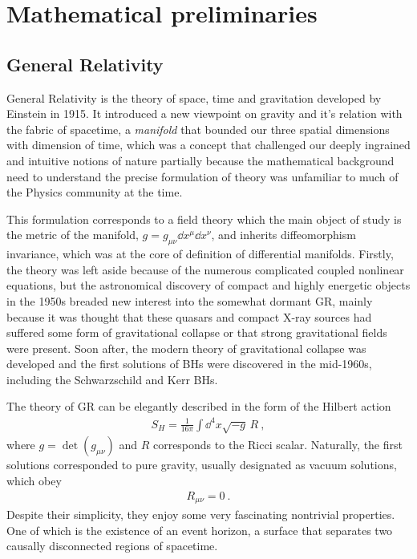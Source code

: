 
\chapter{Mathematical preliminaries} %
\label{Chapter2}


\section{General Relativity}

General Relativity is the theory of space, time and gravitation developed by Einstein in 1915. 
It introduced a new viewpoint on gravity and it's relation with the fabric of spacetime, a \emph{manifold} that bounded our three spatial dimensions with dimension of time, which was a concept that challenged our deeply ingrained and intuitive notions of nature partially because the mathematical background need to understand the precise formulation of theory was unfamiliar to much of the Physics community at the time.

This formulation corresponds to a field theory which the main object of study is the metric of the manifold, $g=g_{\mu\nu} \dd x^\mu \dd x^\nu$, and inherits diffeomorphism invariance, which was at the core of definition of differential manifolds. Firstly, the theory was left aside because of the numerous complicated coupled nonlinear equations, but the astronomical discovery of compact and highly energetic objects in the 1950s breaded new interest into the somewhat dormant GR, mainly because it was thought that these quasars and compact X-ray sources had suffered some form of gravitational collapse or that strong gravitational fields were present.
Soon after, the modern theory of gravitational collapse was developed and the first solutions of BHs were discovered in the mid-1960s, including the Schwarzschild and Kerr BHs.

The theory of GR can be elegantly described in the form of the Hilbert action
\begin{align}
    S_{H} = \frac{1}{16\pi} \int \dd^4 x \sqrt{-g} \,R ~,
    \label{eq2:actionGR}
\end{align}
where $g=\det(g_{\mu\nu})$ and $R$ corresponds to the Ricci scalar.
Naturally, the first solutions corresponded to pure gravity, usually designated as vacuum solutions, which obey
\begin{align}
    R_{\mu\nu} = 0 ~.
    \label{eq2:vacuumGR}
\end{align}
Despite their simplicity, they enjoy some very fascinating nontrivial properties. 
One of which is the existence of an event horizon, a surface that separates two causally disconnected regions of spacetime.

